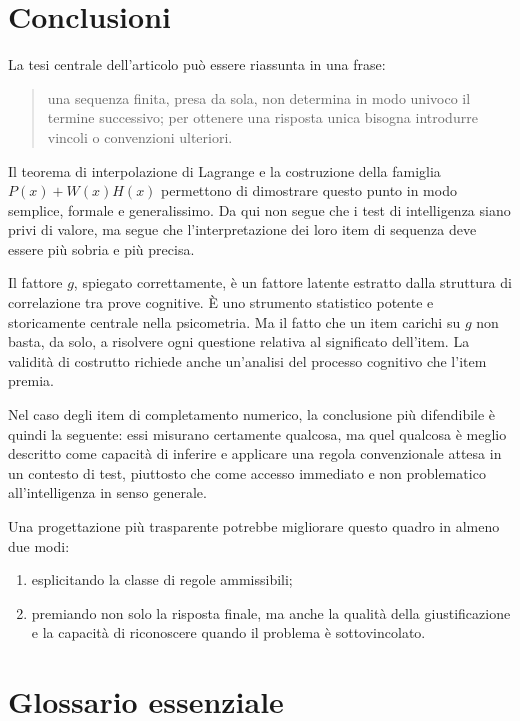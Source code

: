 \documentclass[10pt, a4paper]{article}
\theoremstyle{plain}
\theoremstyle{definition}
\theoremstyle{remark}
\begin{document}
\section{Conclusioni}
\label{sec:conclusion}

La tesi centrale dell'articolo può essere riassunta in una frase:
\begin{quote}
una sequenza finita, presa da sola, non determina in modo univoco il termine
successivo; per ottenere una risposta unica bisogna introdurre vincoli o
convenzioni ulteriori.
\end{quote}

Il teorema di interpolazione di Lagrange e la costruzione della famiglia
$P(x)+W(x)H(x)$ permettono di dimostrare questo punto in modo semplice, formale
e generalissimo. Da qui non segue che i test di intelligenza siano privi di
valore, ma segue che l'interpretazione dei loro item di sequenza deve essere più
sobria e più precisa.

Il fattore $g$, spiegato correttamente, è un fattore latente estratto dalla
struttura di correlazione tra prove cognitive. È uno strumento statistico
potente e storicamente centrale nella psicometria. Ma il fatto che un item
carichi su $g$ non basta, da solo, a risolvere ogni questione relativa al
significato dell'item. La validità di costrutto richiede anche un'analisi del
processo cognitivo che l'item premia.

Nel caso degli item di completamento numerico, la conclusione più difendibile è
quindi la seguente: essi misurano certamente qualcosa, ma quel qualcosa è meglio
descritto come capacità di inferire e applicare una regola convenzionale attesa
in un contesto di test, piuttosto che come accesso immediato e non problematico
all'intelligenza in senso generale.

Una progettazione più trasparente potrebbe migliorare questo quadro in almeno due
modi:
\begin{enumerate}[label=\arabic*.]
    \item esplicitando la classe di regole ammissibili;
    \item premiando non solo la risposta finale, ma anche la qualità della
          giustificazione e la capacità di riconoscere quando il problema è
          sottovincolato.
\end{enumerate}

\appendix

\section{Glossario essenziale}
\label{sec:glossary}
\end{document}
